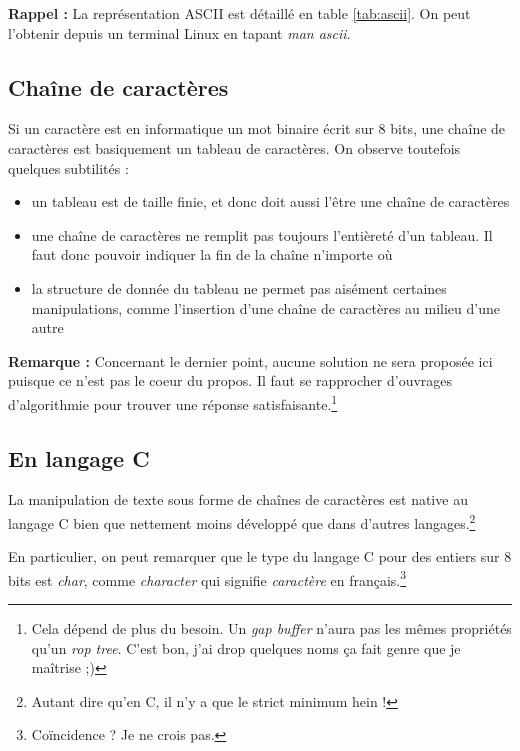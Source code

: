 \documentclass[../../../main.tex]{subfiles}
\begin{document}
\textbf{Rappel :} La représentation \textsf{ASCII} est détaillé en table \ref{tab:ascii}. On peut l'obtenir depuis un terminal Linux en tapant \textit{man ascii}.
\subsection{Chaîne de caractères}\label{sub:cha_ne_de_caract_res}
Si un caractère est en informatique un mot binaire écrit sur 8 bits, une chaîne de caractères est basiquement un tableau de caractères. On observe toutefois quelques subtilités :
\begin{itemize}
  \item un tableau est de taille finie, et donc doit aussi l'être une chaîne de caractères
  \item une chaîne de caractères ne remplit pas toujours l'entièreté d'un tableau. Il faut donc pouvoir indiquer la fin de la chaîne n'importe où
  \item la structure de donnée du tableau ne permet pas aisément certaines manipulations, comme l'insertion d'une chaîne de caractères au milieu d'une autre
\end{itemize}
\textbf{Remarque :} Concernant le dernier point, aucune solution ne sera proposée ici puisque ce n'est pas le coeur du propos. Il faut se rapprocher d'ouvrages d'algorithmie pour trouver une réponse satisfaisante.\footnote{Cela dépend de plus du besoin. Un \textit{gap buffer} n'aura pas les mêmes propriétés qu'un \textit{rop tree}. C'est bon, j'ai drop quelques noms ça fait genre que je maîtrise ;)}
\subsection{En langage C}\label{sub:en_langage_c}
La manipulation de texte sous forme de chaînes de caractères est native au langage C bien que nettement moins développé que dans d'autres langages.\footnote{Autant dire qu'en C, il n'y a que le strict minimum hein !}
 
En particulier, on peut remarquer que le type du langage C pour des entiers sur 8 bits est \textit{char}, comme \textit{character} qui signifie \textit{caractère} en français.\footnote{Coïncidence ? Je ne crois pas.}
 
\end{document}
